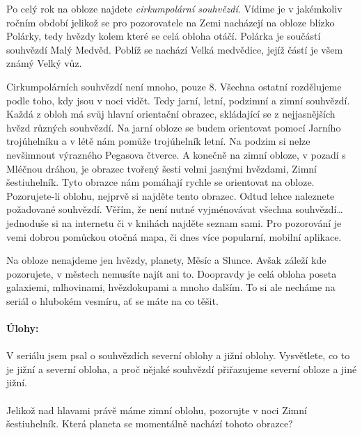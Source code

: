 \documentclass{../../../../style/mkimain}
\begin{document}
Po celý rok na obloze najdete \textit{cirkumpolární souhvězdí}. 
Vídime je v jakémkoliv ročním období jelikož se pro pozorovatele na Zemi nacházejí na obloze blízko Polárky, tedy hvězdy kolem které se celá obloha otáčí.
Polárka je součástí souhvězdí Malý Medvěd.
Poblíž se nachází Velká medvědice, jejíž částí je všem známý Velký vůz.

Cirkumpolárních souhvězdí není mnoho, pouze 8. Všechna ostatní rozdělujeme podle toho, kdy jsou v noci vidět.
Tedy jarní, letní, podzimní a zimní souhvězdí.
Každá z obloh má svůj hlavní orientační obrazec, skládající se z nejjasnějších hvězd různých souhvězdí.
Na jarní obloze se budem orientovat pomocí Jarního trojúhelníku a v létě nám pomůže trojúhelník letní.
Na podzim si nelze nevšimnout výrazného Pegasova čtverce.
A konečně na zimní obloze, v pozadí s Mléčnou dráhou, je obrazec tvořený šesti velmi jasnými hvězdami, Zimní šestiuhelník.
Tyto obrazce nám pomáhají rychle se orientovat na obloze.
Pozorujete-li oblohu, nejprvě si najděte tento obrazec. Odtud lehce naleznete požadované souhvězdí.
Věřím, že není nutné vyjménovávat všechna souhvězdí\dots jednoduše si na internetu či v knihách najděte seznam sami.
Pro pozorování je vemi dobrou pomůckou otočná mapa, či dnes více popularní, mobilní aplikace.

Na obloze nenajdeme jen hvězdy, planety, Měsíc a Slunce. Avšak záleží kde pozorujete, v městech nemusíte najít ani to.
Doopravdy je celá obloha poseta galaxiemi, mlhovinami, hvězdokupami a mnoho dalším. 
To si ale necháme na seriál o hlubokém vesmíru, ať se máte na co těšit.
\\
\\
\textbf{Úlohy:} %
\\
\\
V seriálu jsem psal o souhvězdích severní oblohy a jižní oblohy.
Vysvětlete, co to je jižní a severní obloha, a proč nějaké souhvězdí přiřazujeme severní obloze a jiné jižní.
\\
\\
Jelikož nad hlavami právě máme zimní oblohu, pozorujte v noci Zimní šestiuhelník.
Která planeta se momentálně nachází  tohoto obrazce?
\end{document}
